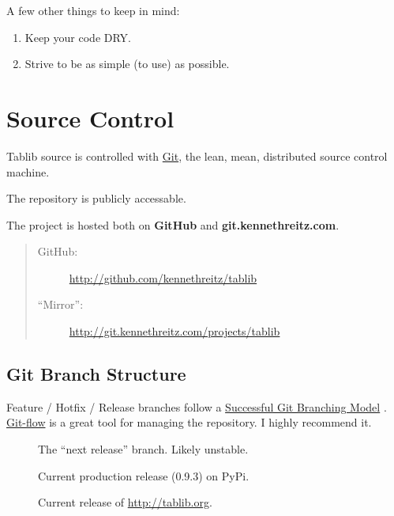 \documentclass[a4paper,12pt,english]{sphinxmanual}
\begin{document}
A few other things to keep in mind:
\begin{enumerate}
\item {} 
Keep your code DRY.

\item {} 
Strive to be as simple (to use) as possible.

\end{enumerate}


\section{Source Control}
\label{development:scm}\label{development:source-control}
Tablib source is controlled with \href{http://git-scm.org}{Git}, the lean, mean, distributed source control machine.

The repository is publicly accessable.
\begin{quote}

\end{quote}

The project is hosted both on \textbf{GitHub} and \textbf{git.kennethreitz.com}.
\begin{quote}
\begin{description}
\item[{GitHub:}] \leavevmode
\href{http://github.com/kennethreitz/tablib}{http://github.com/kennethreitz/tablib}

\item[{``Mirror'':}] \leavevmode
\href{http://git.kennethreitz.com/projects/tablib}{http://git.kennethreitz.com/projects/tablib}

\end{description}
\end{quote}


\subsection{Git Branch Structure}
\label{development:git-branch-structure}
Feature / Hotfix / Release branches follow a \href{http://nvie.com/posts/a-successful-git-branching-model/}{Successful Git Branching Model} . \href{http://github.com/nvie/gitflow}{Git-flow} is a great tool for managing the repository. I highly recommend it.
\begin{description}
\item[{}] \leavevmode
The ``next release'' branch. Likely unstable.

\item[{}] \leavevmode
Current production release (0.9.3) on PyPi.

\item[{}] \leavevmode
Current release of \href{http://tablib.org}{http://tablib.org}.

\end{description}
\end{document}
